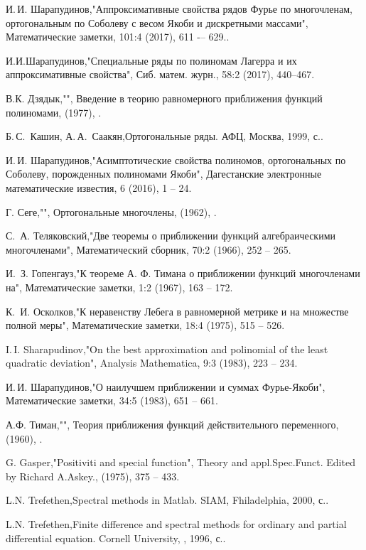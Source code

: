\begin{thebibliography}{20}
И.\,И. Шарапудинов,"Аппроксимативные свойства рядов Фурье по многочленам, ортогональным по Соболеву с весом Якоби и дискретными массами", Математические заметки, 101:4 (2017), 611 -– 629..

И.И.Шарапудинов,"Специальные ряды по полиномам Лагерра и их аппроксимативные свойства", Сиб. матем. журн., 58:2 (2017), 440–467.

В.К. Дзядык,"", Введение в теорию равномерного приближения функций полиномами,  (1977), .

Б.\,С.~Кашин, А.\,А.~Саакян,Ортогональные ряды. АФЦ, Москва, 1999,  с..

И.\,И. Шарапудинов,"Асимптотические свойства полиномов, ортогональных по Соболеву, порожденных полиномами Якоби", Дагестанские электронные математические известия, 6 (2016), 1 -- 24.

Г. Сеге,"", Ортогональные многочлены,  (1962), .

С.\, А. Теляковский,"Две теоремы о приближении функций алгебраическими многочленами", Математический сборник, 70:2 (1966), 252 -- 265.

И.\, З. Гопенгауз,"К теореме А. Ф. Тимана о приближении функций многочленами на", Математические  заметки, 1:2 (1967), 163 -- 172.

К.\, И. Осколков,"К неравенству Лебега в равномерной метрике и на множестве полной меры", Математические  заметки, 18:4 (1975), 515 -- 526.

I.\,I. Sharapudinov,"On the best approximation and polinomial of the least quadratic deviation", Analysis Mathematica, 9:3 (1983), 223 -- 234.

И.\,И. Шарапудинов,"О наилучшем приближении и суммах Фурье-Якоби", Математические заметки, 34:5 (1983), 651 -- 661.

А.Ф. Тиман,"", Теория приближения функций действительного переменного,  (1960), .

G. Gasper,"Positiviti and special function", Theory and appl.Spec.Funct. Edited by Richard A.Askey.,  (1975), 375 -- 433.

L.N. Trefethen,Spectral methods in Matlab. SIAM, Fhiladelphia, 2000,  с..

L.N. Trefethen,Finite difference and spectral methods for ordinary and partial differential equation. Cornell University, , 1996,  с..


\end{thebibliography}
